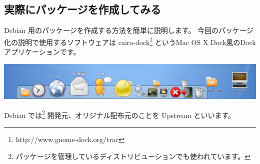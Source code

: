 \documentclass[mingoth,a4paper]{jsarticle}
\begin{document}

\subsection{実際にパッケージを作成してみる}

	Debian 用のパッケージを作成する方法を簡単に説明します。	
	今回のパッケージ化の説明で使用するソフトウェアは cairo-dock\footnote{http://www.gnome-dock.org/trac} 
	というMac OS X Dock風のDockアプリケーションです。
	
	\begin{center}
		\includegraphics[width=0.5\hsize]{image200611/cairo-dock-ss.png}
	\end{center}

	Debian では\footnote{パッケージを管理しているディストリビューションでも使われています。}
	開発元、オリジナル配布元のことを Upstream といいます。
\end{document}
